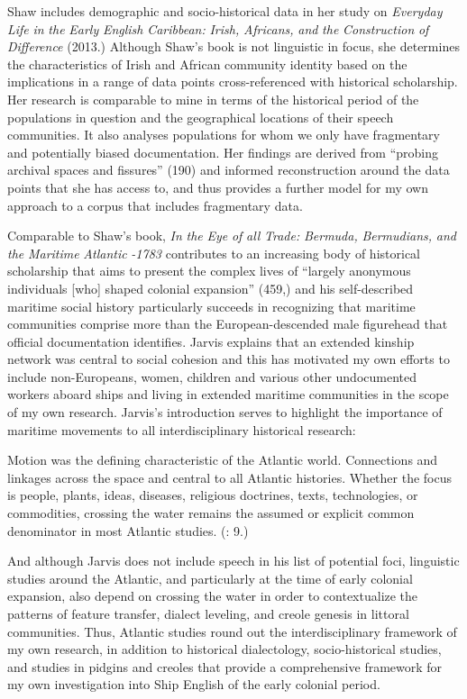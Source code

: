 Shaw includes demographic and socio-historical data in her study on \textit{Everyday} \textit{Life} \textit{in} \textit{the} \textit{Early} \textit{English} \textit{Caribbean:} \textit{Irish,} \textit{Africans,} \textit{and} \textit{the} \textit{Construction} \textit{of} \textit{Difference} (2013.) Although Shaw’s book is not linguistic in focus, she determines the characteristics of Irish and African community identity based on the implications in a range of data points cross-referenced with historical scholarship. Her research is comparable to mine in terms of the historical period of the populations in question and the geographical locations of their speech communities. It also analyses populations for whom we only have fragmentary and potentially biased documentation. Her findings are derived from “probing archival spaces and fissures” (190) and informed reconstruction around the data points that she has access to, and thus provides a further model for my own approach to a corpus that includes fragmentary data. 

Comparable to Shaw’s book,  \textit{In} \textit{the} \textit{Eye} \textit{of} \textit{all} \textit{Trade:} \textit{Bermuda,} \textit{Bermudians,} \textit{and} \textit{the} \textit{Maritime} \textit{Atlantic} \textit{\citealt{World1680}-1783} contributes to an increasing body of historical scholarship that aims to present the complex lives of “largely anonymous individuals [who] shaped colonial expansion” (459,) and his self-described maritime social history particularly succeeds in recognizing that maritime communities comprise more than the European-descended male figurehead that official documentation identifies. Jarvis explains that an extended kinship network was central to social cohesion and this has motivated my own efforts to include non-Europeans, women, children and various other undocumented workers aboard ships and living in extended maritime communities in the scope of my own research. Jarvis’s introduction serves to highlight the importance of maritime movements to all interdisciplinary historical research: 

Motion was the defining characteristic of the Atlantic world. Connections and linkages across the space and central to all Atlantic histories. Whether the focus is people, plants, ideas, diseases, religious doctrines, texts, technologies, or commodities, crossing the water remains the assumed or explicit common denominator in most Atlantic studies. (\citealt{Jarvis2010}: 9.)

And although Jarvis does not include speech in his list of potential foci, linguistic studies around the Atlantic, and particularly at the time of early colonial expansion, also depend on crossing the water in order to contextualize the patterns of feature transfer, dialect leveling, and creole genesis in littoral communities. Thus, Atlantic studies round out the interdisciplinary framework of my own research, in addition to historical dialectology, socio-historical studies, and studies in pidgins and creoles that provide a comprehensive framework for my own investigation into Ship English of the early colonial period. 

